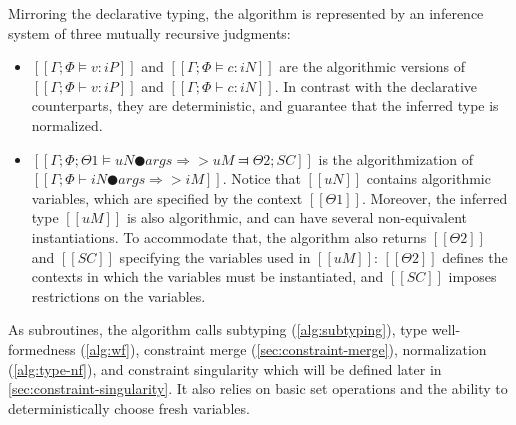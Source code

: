 \documentclass[acmsmall,natbib=false,review,anonymous]{acmart}
\begin{document}
Mirroring the declarative typing, 
the algorithm is represented by an inference system of three mutually recursive
judgments:
\begin{itemize}
  \item $[[Γ ; Φ ⊨ v : iP]]$ and  $[[Γ ; Φ ⊨ c : iN]]$
    are the algorithmic versions of $[[Γ ; Φ ⊢ v : iP]]$ and $[[Γ ; Φ ⊢ c : iN]]$.
    In contrast with the declarative counterparts, they are deterministic,
    and guarantee that the inferred type is normalized. 
  \item $[[Γ ; Φ ; Θ1 ⊨ uN ● args ⇒> uM ⫤ Θ2 ; SC]]$
    is the algorithmization of $[[Γ ; Φ ⊢ iN ● args ⇒> iM]]$.
    Notice that $[[uN]]$ contains algorithmic variables, 
    which are specified by the context $[[Θ1]]$.
    Moreover, the inferred type $[[uM]]$ is also algorithmic,
    and can have several non-equivalent instantiations. To accommodate that, 
    the algorithm also returns $[[Θ2]]$ and $[[SC]]$ specifying 
    the variables used in $[[uM]]$: $[[Θ2]]$ defines the contexts
    in which the variables must be instantiated, and $[[SC]]$
    imposes restrictions on the variables. 
\end{itemize}
As subroutines, the algorithm calls
subtyping (\cref{alg:subtyping}),
type well-formedness (\cref{alg:wf}),
constraint merge (\cref{sec:constraint-merge}),
normalization (\cref{alg:type-nf}),
and constraint singularity which will be defined later in 
\cref{sec:constraint-singularity}.
It also relies on basic set operations and the ability to 
deterministically choose fresh variables.

\begin{algorithm}
  \hfill\\
  \ottdefnATNInf{}
  \ottdefnATPInf{}
  \ottdefnATSpinInf{}
\end{algorithm}
\end{document}
